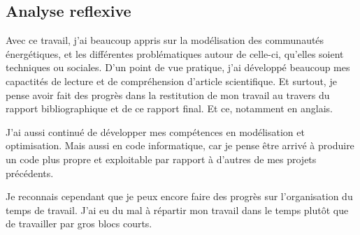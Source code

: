 \subsection{Analyse reflexive}

Avec ce travail, j'ai beaucoup appris sur la modélisation des communautés énergétiques, et les différentes problématiques autour de celle-ci, qu'elles soient techniques ou sociales. D'un point de vue pratique, j'ai développé beaucoup mes capactités de lecture et de compréhension d'article scientifique. Et surtout, je pense avoir fait des progrès dans la restitution de mon travail au travers du rapport bibliographique et de ce rapport final. Et ce, notamment en anglais.

J'ai aussi continué de développer mes compétences en modélisation et optimisation. Mais aussi en code informatique, car je pense être arrivé à produire un code plus propre et exploitable par rapport à d'autres de mes projets précédents. 

Je reconnais cependant que je peux encore faire des progrès sur l'organisation du temps de travail. J'ai eu du mal à répartir mon travail dans le temps plutôt que de travailler par gros blocs courts.
